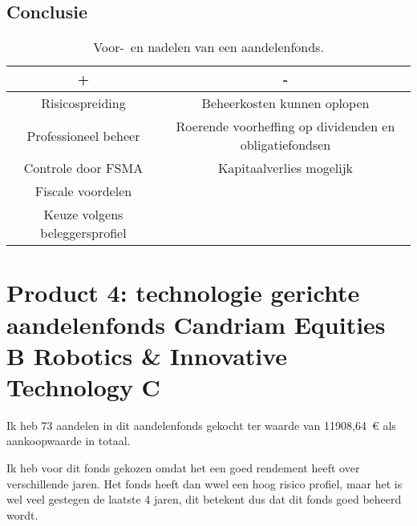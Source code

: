 \subsection{Conclusie}


\begin{table}[!htbp]
	\centering
		\begin{tabular}{c|c}
			\toprule
			
			 \cellcolor{lightgray}            +              &  \cellcolor{lightgray}                                      -                                        \\ \midrule
			 Risicospreiding   & Beheerkosten kunnen oplopen          \\ \hline
			  Professioneel beheer  & Roerende voorheffing op dividenden en obligatiefondsen \\ \hline
			Controle door FSMA & Kapitaalverlies mogelijk \\ \hline
			       Fiscale voordelen &   \\ \hline
			       Keuze volgens beleggersprofiel &   \\ \bottomrule
		\end{tabular}
	\caption{Voor-~en nadelen van een aandelenfonds.}
	\label{tab:voordelenennadelenaandelenfonds1}
\end{table}


\section{Product 4: technologie gerichte aandelenfonds Candriam Equities B Robotics \& Innovative Technology C}


Ik heb 73 aandelen in dit aandelenfonds gekocht ter waarde van 11908,64~\euro{} als aankoopwaarde in totaal.

Ik heb voor dit fonds gekozen omdat het een goed rendement heeft over verschillende jaren. Het fonds heeft dan wwel een hoog risico profiel, maar het is wel veel gestegen de laatste 4 jaren, dit betekent dus dat dit fonds goed beheerd wordt.

